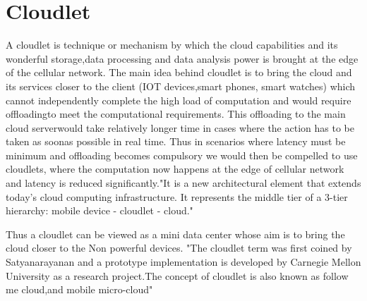 \section{Cloudlet}


A cloudlet is technique or mechanism by which the cloud capabilities
and its wonderful storage,data processing and data analysis power is 
brought at the edge of the cellular network.
The main idea behind cloudlet is to bring the cloud and its services closer
to the client (IOT devices,smart phones, smart watches) which cannot 
independently complete the high load of computation and would require 
offloadingto meet the computational requirements. This offloading to the 
main cloud serverwould take relatively longer time in cases where the action 
has to be taken as soonas possible in real time. Thus in scenarios where 
latency must be minimum and offloading becomes compulsory we would then 
be compelled to use cloudlets, where the computation now happens at the 
edge of cellular network and latency is reduced significantly."It is a 
new architectural element that extends today’s cloud computing infrastructure. 
It represents the middle tier of a 3-tier hierarchy: mobile device - 
cloudlet - cloud."~\cite{wikiCloudlet}

Thus a cloudlet can be viewed as a mini data center whose aim is to 
bring the cloud closer to the Non powerful devices. "The cloudlet term was first coined 
by Satyanarayanan and a prototype implementation is developed by Carnegie 
Mellon University as a research project.The concept of cloudlet is also 
known as follow me cloud,and mobile micro-cloud"~\cite{wikiCloudlet}
